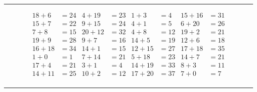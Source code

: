 \documentclass{article}
\begin{document}
\begin{sloppy}
\hrule
\begin{align*}
    {18} + {6} &= {24} & {4} + {19} &= {23} & {1} + {3} &= {4} & {15} + {16} &= {31} \\
    {15} + {7} &= {22} & {9} + {15} &= {24} & {4} + {1} &= {5} & {6} + {20} &= {26} \\
    {7} + {8} &= {15} & {20} + {12} &= {32} & {4} + {8} &= {12} & {19} + {2} &= {21} \\
    {19} + {9} &= {28} & {9} + {7} &= {16} & {14} + {5} &= {19} & {12} + {6} &= {18} \\
    {16} + {18} &= {34} & {14} + {1} &= {15} & {12} + {15} &= {27} & {17} + {18} &= {35} \\
    {1} + {0} &= {1} & {7} + {14} &= {21} & {5} + {18} &= {23} & {14} + {7} &= {21} \\
    {17} + {4} &= {21} & {3} + {1} &= {4} & {14} + {19} &= {33} & {8} + {3} &= {11} \\
    {14} + {11} &= {25} & {10} + {2} &= {12} & {17} + {20} &= {37} & {7} + {0} &= {7} \\
\end{align*}
\hrule
\end{sloppy}
\end{document}
